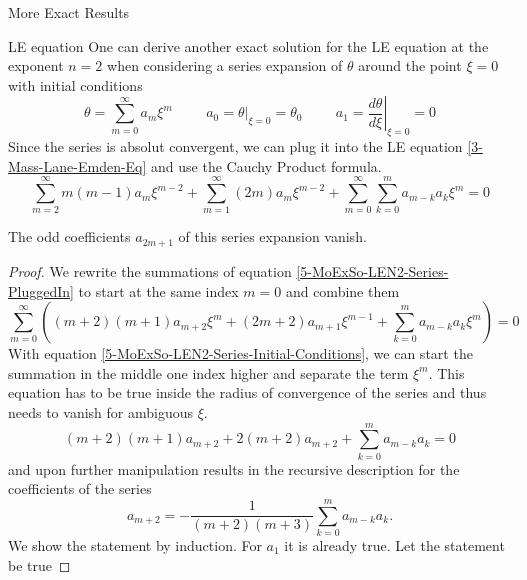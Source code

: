 \begin{section}{More Exact Results}
\begin{subsection}{LE equation}
One can derive another exact solution for the LE equation at the exponent $n=2$ when 
considering a series expansion of $\theta$ around the point $\xi=0$ with initial conditions
\begin{equation}
	\theta=\sum\limits_{m=0}^\infty a_m\xi^m \hspace{1cm} a_0=\left.\theta\right|_{\xi=0}=\theta_0 
	\hspace{1cm} a_1=\left.\frac{d\theta}{d\xi}\right|_{\xi=0}=0
	\label{5-MoExSo-LEN2-Series-Initial-Conditions}
\end{equation}
Since the series is absolut convergent, we can plug it into the LE equation 
\ref{3-Mass-Lane-Emden-Eq} and use the Cauchy Product formula.
\begin{equation}
	\sum\limits_{m=2}^\infty m(m-1)a_m\xi^{m-2}+\sum\limits_{m=1}^\infty (2m)a_m\xi^{m-2} + 
	\sum\limits_{m=0}^\infty\sum\limits_{k=0}^m a_{m-k}a_k\xi^m = 0
	\label{5-MoExSo-LEN2-Series-PluggedIn}
\end{equation}
\begin{theorem}
	The odd coefficients $a_{2m+1}$ of this series expansion vanish.
\end{theorem}
\begin{proof}
	We rewrite the summations of equation \ref{5-MoExSo-LEN2-Series-PluggedIn} to start at the 
	same index $m=0$ and combine them
	\begin{equation}
		\sum\limits_{m=0}^\infty\left((m+2)(m+1)a_{m+2}\xi^{m}+(2m+2)a_{m+1}\xi^{m-1} + 
		\sum\limits_{k=0}^m a_{m-k}a_k\xi^m\right) = 0
	\end{equation}
	With equation \ref{5-MoExSo-LEN2-Series-Initial-Conditions}, we can start the summation 
	in the middle one index higher and separate the term $\xi^m$. This equation has to be true 
	inside the radius of convergence of the series and thus needs to vanish for ambiguous $\xi$.
	\begin{equation}
		(m+2)(m+1)a_{m+2}+2(m+2)a_{m+2}+\sum\limits_{k=0}^ma_{m-k}a_k = 0
	\end{equation}
	and upon further manipulation results in the recursive description for the coefficients 
	of the series
	\begin{equation}
		a_{m+2} = -\frac{1}{(m+2)(m+3)}\sum\limits_{k=0}^ma_{m-k}a_k.
		\label{5-MoExSo-LEN2-Recursive-Coefficients}
	\end{equation}
	We show the statement by induction. For $a_1$ it is already true. Let the statement be true 

\end{proof}
\end{subsection}
\end{section}
